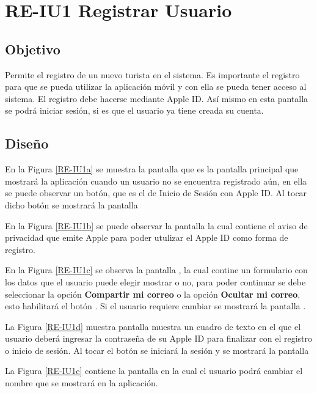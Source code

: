 \newpage
\section{RE-IU1 Registrar Usuario}

\subsection{Objetivo}
Permite el registro de un nuevo turista en el sistema. Es importante el registro para que se pueda utilizar la aplicación móvil y con ella se pueda tener acceso al sistema. El registro debe hacerse mediante Apple ID. Así mismo en esta pantalla se podrá iniciar sesión, si es que el usuario ya tiene creada su cuenta.

\subsection{Diseño}
En la Figura \ref{RE-IU1a} se muestra la pantalla  que es la pantalla principal que mostrará la aplicación cuando un usuario no se encuentra registrado aún, en ella se puede observar un botón, que es el de Inicio de Sesión con Apple ID. Al tocar dicho botón se mostrará la pantalla 



\newpage
En la Figura \ref{RE-IU1b} se puede observar la pantalla  la cual contiene el aviso de privacidad que emite Apple para poder utulizar el Apple ID como forma de registro.


En la Figura \ref{RE-IU1c} se observa la pantalla , la cual contine un formulario con los datos que el usuario puede elegir mostrar o no, para poder continuar se debe seleccionar la opción \textbf{Compartir mi correo} o la opción \textbf{Ocultar mi correo}, esto habilitará el botón . Si el usuario requiere cambiar se mostrará la pantalla .


La Figura \ref{RE-IU1d} muestra pantalla  muestra un cuadro de texto en el que el usuario deberá ingresar la contraseña de su Apple ID para finalizar con el registro o inicio de sesión. Al tocar el botón  se iniciará la sesión y se mostrará la pantalla 



La Figura \ref{RE-IU1e} contiene la pantalla  en la cual el usuario podrá cambiar el nombre que se mostrará en la aplicación.

